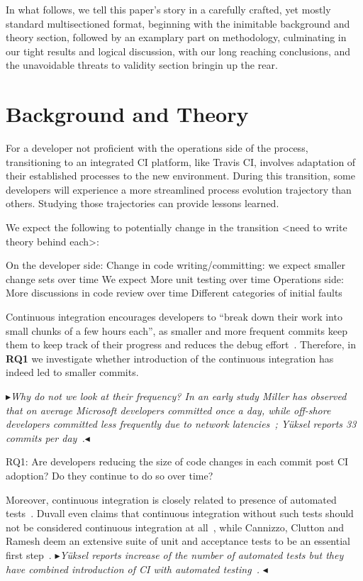 \documentclass[conference]{IEEEtran}
\newcommand{\nnbb}[2]{
    \fbox{\bfseries\sffamily\scriptsize#1}
    {\sf\small$\blacktriangleright$\textit{#2}$\blacktriangleleft$}
   }
\newcommand{\as}[1]{\nnbb{Alexander}{#1}}
\begin{document}
In what follows, we tell this paper's story in a carefully crafted, yet mostly standard multisectioned format, beginning with the inimitable background and theory section, followed by an examplary part on methodology, culminating in our tight results and logical discussion, with our long reaching conclusions, and the unavoidable threats to validity section bringin up the rear.


\section{Background and Theory}

For a developer not proficient with the operations side of the process, transitioning to an integrated CI platform, like Travis CI, involves adaptation of their established processes to the new environment. During this transition, some developers will experience a more streamlined process evolution trajectory than others. Studying those trajectories can provide lessons learned.


We expect the following to potentially change in the transition <need to write theory behind each>:

On the developer side:
Change in code writing/committing: we expect smaller change sets over time
We expect More unit testing over time
Operations side:
More discussions in code review over time
Different categories of initial faults

Continuous integration encourages developers to ``break down their work into small chunks of a few hours each'', as smaller and more frequent commits keep them to keep track of their progress and reduces the debug effort~\cite{Fowler,Duvall}. %
Therefore, in \textbf{RQ1} we investigate whether introduction of the continuous integration has indeed led to smaller commits.
\as{Why do not we look at their frequency? In an early study Miller has observed that on average Microsoft developers committed once a day, while off-shore developers committed less frequently due to network latencies~\cite{Miller}; Y\"{u}ksel reports 33 commits per day~\cite{Yuksel}.}

RQ1: Are developers reducing the size of code changes in each commit post CI adoption? Do they continue to do so over time?

Moreover, continuous integration is closely related to presence of automated tests~\cite{Fowler}. Duvall even claims that continuous integration without such tests should not be considered continuous integration at all~\cite{Duvall}, while Cannizzo, Clutton and Ramesh deem an extensive suite of unit and acceptance tests to be an essential first step~\cite{CannizzoCluttonRamesh}. \as{Y\"{u}ksel reports increase of the number of automated tests but they have combined introduction of CI with automated testing~\cite{Yuksel}. }
\end{document}
